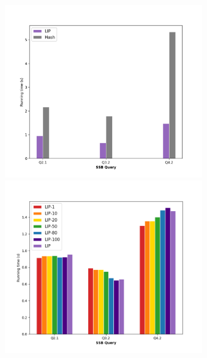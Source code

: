 \documentclass{beamer}
\begin{document}
\begin{frame}
\begin{columns}
\begin{column}{0.25\textwidth}
    \end{column}
    \begin{column}{0.7\textwidth}
    \begin{figure}
    \hspace*{2cm}
      \centering
      \begin{overprint}
            \includegraphics[width=0.8\textwidth,keepaspectratio]{time-graph-hash}
            \includegraphics[width=0.8\textwidth,keepaspectratio]{time-graph-no-hash}
      \end{overprint}
    \end{figure}
    \end{column}
  \end{columns}


  \begin{itemize}
  \end{itemize}
\end{frame}
\end{document}
